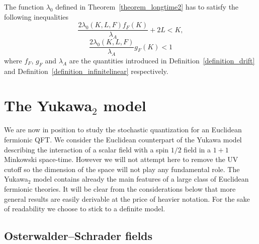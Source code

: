 \documentclass{article}
\begin{document}
\begin{remark}
  The function $\lambda_0$ defined in Theorem~\ref{theorem_longtime2} has to
  satisfy the following inequalities
  \begin{equation}
    \frac{2 \lambda_0 (K, L, F) f_F (K)}{\lambda_A} + 2 L < K
    \label{eq:contraction3},
  \end{equation}
  \begin{equation}
    \frac{2 \lambda_0 (K, L, F)}{\lambda_A} g_F (K) < 1
    \label{eq:contraction4}
  \end{equation}
  where $f_F$, $g_F$ and $\lambda_A$ are the quantities introduced in
  Definition~\ref{definition_drift} and
  Definition~\ref{definition_infinitelinear} respectively.
\end{remark}

\section{The Yukawa$_2$ model}\label{sec:yukawa}

We are now in position to study the stochastic quantization for an Euclidean
fermionic QFT. We consider the Euclidean counterpart of the Yukawa model
describing the interaction of a scalar field with a spin $1 / 2$ field in a $1
+ 1$ Minkowski space-time. However we will not attempt here to remove the UV
cutoff so the dimension of the space will not play any fundamental role. The
Yukawa$_2$ model contains already the main features of a large class of
Euclidean fermionic theories. It will be clear from the considerations below
that more general results are easily derivable at the price of heavier
notation. For the sake of readability we choose to stick to a definite model.

\subsection{Osterwalder--Schrader fields}
\end{document}
